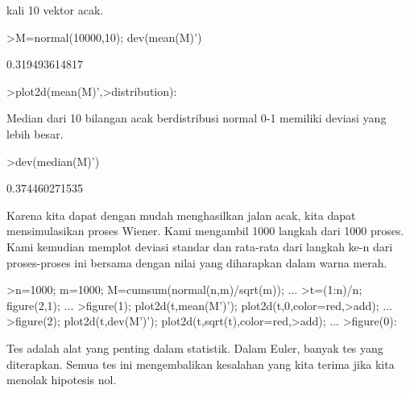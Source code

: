 \documentclass[a4paper,10pt]{article}
\begin{document}
\begin{eulernotebook}
\begin{eulercomment}
kali 10 vektor acak.
\end{eulercomment}
\begin{eulerprompt}
>M=normal(10000,10); dev(mean(M)')
\end{eulerprompt}
\begin{euleroutput}
  0.319493614817
\end{euleroutput}
\begin{eulerprompt}
>plot2d(mean(M)',>distribution):
\end{eulerprompt}
\begin{eulercomment}
Median dari 10 bilangan acak berdistribusi normal 0-1 memiliki deviasi
yang lebih besar.
\end{eulercomment}
\begin{eulerprompt}
>dev(median(M)')
\end{eulerprompt}
\begin{euleroutput}
  0.374460271535
\end{euleroutput}
\begin{eulercomment}
Karena kita dapat dengan mudah menghasilkan jalan acak, kita dapat
mensimulasikan proses Wiener. Kami mengambil 1000 langkah dari 1000
proses. Kami kemudian memplot deviasi standar dan rata-rata dari
langkah ke-n dari proses-proses ini bersama dengan nilai yang
diharapkan dalam warna merah.
\end{eulercomment}
\begin{eulerprompt}
>n=1000; m=1000; M=cumsum(normal(n,m)/sqrt(m)); ...
>t=(1:n)/n; figure(2,1); ...
>figure(1); plot2d(t,mean(M')'); plot2d(t,0,color=red,>add); ...
>figure(2); plot2d(t,dev(M')'); plot2d(t,sqrt(t),color=red,>add); ...
>figure(0):
\end{eulerprompt}
\begin{eulercomment}
Tes adalah alat yang penting dalam statistik. Dalam Euler, banyak tes
yang diterapkan. Semua tes ini mengembalikan kesalahan yang kita
terima jika kita menolak hipotesis nol.


\end{eulercomment}
\end{eulernotebook}
\end{document}
